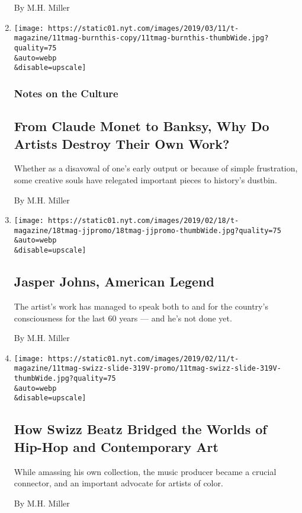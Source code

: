 \begin{enumerate}
  By M.H. Miller
\item
  \href{/2019/03/11/t-magazine/artists-destroy-past-work.html}{}

  \texttt{[image: https://static01.nyt.com/images/2019/03/11/t-magazine/11tmag-burnthis-copy/11tmag-burnthis-thumbWide.jpg?quality=75\\\&auto=webp\\\&disable=upscale]}

  \hypertarget{notes-on-the-culture}{%
  \subsubsection{Notes on the Culture}\label{notes-on-the-culture}}

  \hypertarget{from-claude-monet-to-banksy-why-do-artists-destroy-their-own-work}{%
  \subsection{From Claude Monet to Banksy, Why Do Artists Destroy Their
  Own
  Work?}\label{from-claude-monet-to-banksy-why-do-artists-destroy-their-own-work}}

  Whether as a disavowal of one's early output or because of simple
  frustration, some creative souls have relegated important pieces to
  history's dustbin.

  By M.H. Miller
\item
  \href{/2019/02/18/t-magazine/jasper-johns.html}{}

  \texttt{[image: https://static01.nyt.com/images/2019/02/18/t-magazine/18tmag-jjpromo/18tmag-jjpromo-thumbWide.jpg?quality=75\\\&auto=webp\\\&disable=upscale]}

  \hypertarget{jasper-johns-american-legend}{%
  \subsection{Jasper Johns, American
  Legend}\label{jasper-johns-american-legend}}

  The artist's work has managed to speak both to and for the country's
  consciousness for the last 60 years --- and he's not done yet.

  By M.H. Miller
\item
  \href{/2019/02/13/t-magazine/swizz-beatz-art.html}{}

  \texttt{[image: https://static01.nyt.com/images/2019/02/11/t-magazine/11tmag-swizz-slide-319V-promo/11tmag-swizz-slide-319V-thumbWide.jpg?quality=75\\\&auto=webp\\\&disable=upscale]}

  \hypertarget{how-swizz-beatz-bridged-the-worlds-of-hip-hop-and-contemporary-art}{%
  \subsection{How Swizz Beatz Bridged the Worlds of Hip-Hop and
  Contemporary
  Art}\label{how-swizz-beatz-bridged-the-worlds-of-hip-hop-and-contemporary-art}}

  While amassing his own collection, the music producer became a crucial
  connector, and an important advocate for artists of color.

  By M.H. Miller
\end{enumerate}

